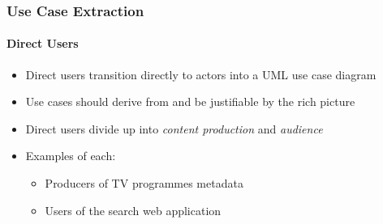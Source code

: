 \documentclass{beamer}
\begin{document}
\begin{frame}
  \frametitle{Use Case Extraction}
  \framesubtitle{Direct Users}
  \begin{itemize}
    \pause \item Direct users transition directly to actors into a UML use case diagram
    \pause \item Use cases should derive from and be justifiable by the rich picture
    \pause \item Direct users divide up into \emph{content production} and \emph{audience}
    \pause \item Examples of each:
    \begin{itemize}
      \pause \item Producers of TV programmes metadata
      \pause \item Users of the search web application
    \end{itemize}
  \end{itemize}
\end{frame}

\end{document}
